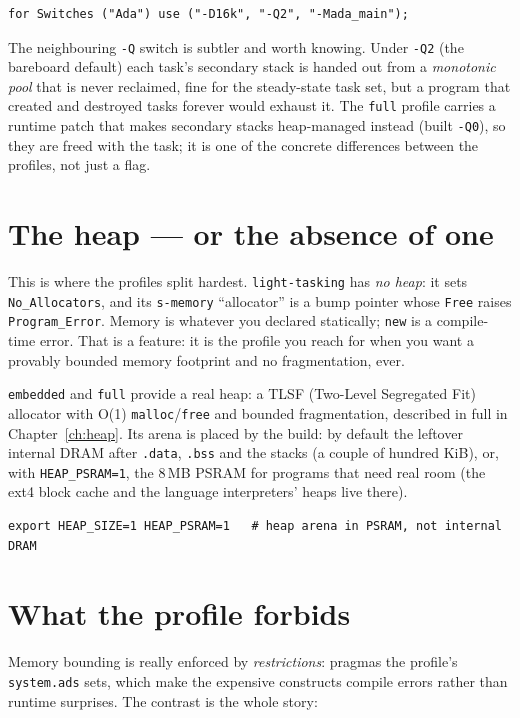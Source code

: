 \begin{lstlisting}[style=sh]
for Switches ("Ada") use ("-D16k", "-Q2", "-Mada_main");
\end{lstlisting}

The neighbouring \texttt{-Q} switch is subtler and worth knowing. Under
\texttt{-Q2} (the bareboard default) each task's secondary stack is handed out from
a \emph{monotonic pool} that is never reclaimed, fine for the steady-state task
set, but a program that created and destroyed tasks forever would exhaust it. The
\texttt{full} profile carries a runtime patch that makes secondary stacks
heap-managed instead (built \texttt{-Q0}), so they are freed with the task; it is
one of the concrete differences between the profiles, not just a flag.

\section{The heap --- or the absence of one}

This is where the profiles split hardest. \texttt{light-tasking} has \emph{no heap}:
it sets \texttt{No\_Allocators}, and its \texttt{s-memory} ``allocator'' is a bump
pointer whose \texttt{Free} raises \texttt{Program\_Error}. Memory is whatever you
declared statically; \texttt{new} is a compile-time error. That is a feature: it
is the profile you reach for when you want a provably bounded memory footprint and
no fragmentation, ever.

\texttt{embedded} and \texttt{full} provide a real heap: a TLSF (Two-Level
Segregated Fit) allocator with O(1) \texttt{malloc}/\texttt{free} and bounded
fragmentation, described in full in Chapter~\ref{ch:heap}. Its arena is placed by
the build: by default the leftover internal DRAM after \texttt{.data},
\texttt{.bss} and the stacks (a couple of hundred KiB), or, with
\texttt{HEAP\_PSRAM=1}, the 8\,MB PSRAM for programs that need real room (the ext4
block cache and the language interpreters' heaps live there).

\begin{lstlisting}[style=sh]
export HEAP_SIZE=1 HEAP_PSRAM=1   # heap arena in PSRAM, not internal DRAM
\end{lstlisting}

\section{What the profile forbids}

Memory bounding is really enforced by \emph{restrictions}: pragmas the profile's
\texttt{system.ads} sets, which make the expensive constructs compile errors rather
than runtime surprises. The contrast is the whole story:

